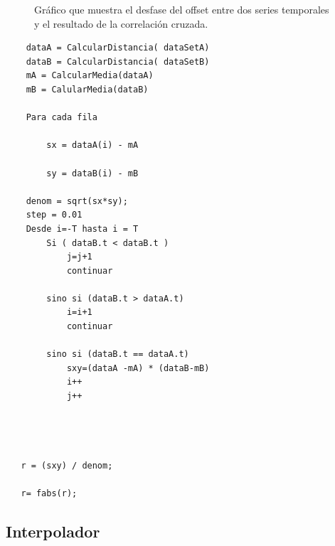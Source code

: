 \begin{figure}[H]
\begin{center}
\hspace{0.5cm}

\end{center}

\caption{Gráfico que muestra el desfase del offset entre dos series temporales y el resultado de la correlación cruzada.}
\end{figure}
	                                
	\begin{lstlisting}
	dataA = CalcularDistancia( dataSetA)
	dataB = CalcularDistancia( dataSetB)
	mA = CalcularMedia(dataA)
	mB = CalularMedia(dataB)

	Para cada fila

   		sx = dataA(i) - mA

   		sy = dataB(i) - mB

   	denom = sqrt(sx*sy);
   	step = 0.01
   	Desde i=-T hasta i = T
   		Si ( dataB.t < dataB.t )
			j=j+1
    		continuar

    	sino si (dataB.t > dataA.t)
    		i=i+1
    		continuar

    	sino si (dataB.t == dataA.t)
    		sxy=(dataA -mA) * (dataB-mB)
        	i++
        	j++


   

   r = (sxy) / denom;

   r= fabs(r);
    \end{lstlisting}



\subsection{Interpolador}

